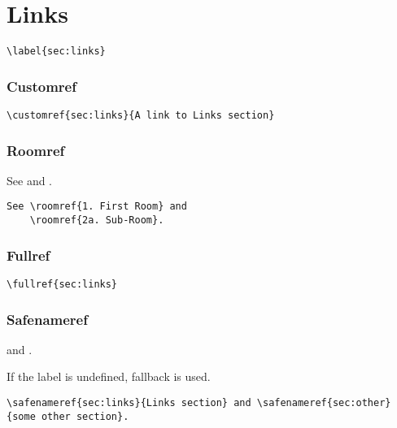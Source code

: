 \documentclass[itdr]{subfiles}
\begin{document}
\vfill
\break

\section{Links}
\label{sec:links}

\begin{lstlisting}
\label{sec:links}
\end{lstlisting}

\subsubsection{Customref}


\begin{lstlisting}
\customref{sec:links}{A link to Links section}
\end{lstlisting}


\subsubsection{Roomref}

See  and .

\begin{lstlisting}
See \roomref{1. First Room} and
	\roomref{2a. Sub-Room}.
\end{lstlisting}


\subsubsection{Fullref}


\begin{lstlisting}
\fullref{sec:links}
\end{lstlisting}


\subsubsection{Safenameref}

 and .

If the label is undefined, fallback is used.

\begin{lstlisting}
\safenameref{sec:links}{Links section} and \safenameref{sec:other}{some other section}.
\end{lstlisting}
\end{document}
